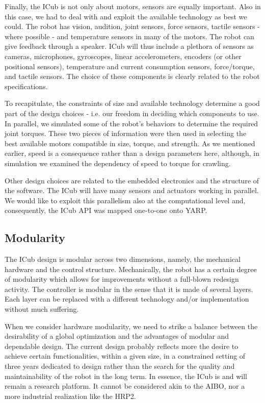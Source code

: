 Finally, the ICub is not only about motors, sensors are equally important. 
Also in this case, we had to deal with and exploit  the available technology as best we could. 
The robot has vision, audition, joint sensors, force sensors, tactile 
sensors - where possible - and temperature sensors in many of the motors. The robot 
can give feedback through a speaker. ICub will thus include a plethora of sensors as
cameras, microphones, gyroscopes, linear accelerometers, encoders (or other positional
sensors), temperature and current consumption sensors, force/torque, and tactile
sensors. The choice of these components is clearly related to the robot specifications.

To recapitulate, the constraints of size and available technology determine a good 
part of the design choices - i.e. our freedom in deciding which components to use. 
In parallel, we simulated some of the robot's behaviors to determine the required 
joint torques. These two pieces of information were then used in selecting the best 
available motors compatible in size, torque, and strength. As we mentioned earlier, 
speed is a consequence rather than a design parameters here, although, in simulation we 
examined the dependency of speed to torque for crawling.

Other design choices are related to the embedded electronics and the structure of 
the software. The ICub will have many sensors and actuators working in parallel. We 
would like to exploit this parallelism also at the computational level and, consequently, 
the ICub API was mapped one-to-one onto YARP.

\subsection{Modularity}
The ICub design is modular across two dimensions, namely, the mechanical hardware
and the control structure. Mechanically, the robot has a certain degree of modularity
which allows for improvements without a full-blown redesign activity. The controller
is modular in the sense that it is made of several layers. Each layer can be replaced
with a different technology and/or implementation without much suffering.

When we consider hardware modularity, we need to strike a balance
between the desirability of a global optimization and the advantages of modular and 
dependable design. The current design probably reflects more the desire
to achieve certain functionalities, within a given size, in a constrained setting of three 
years dedicated to design rather than the search for the quality and maintainability 
of the robot in the long term. In essence, the ICub is and will remain a research 
platform. It cannot be considered akin to the AIBO, nor a more industrial realization 
like the HRP2.

